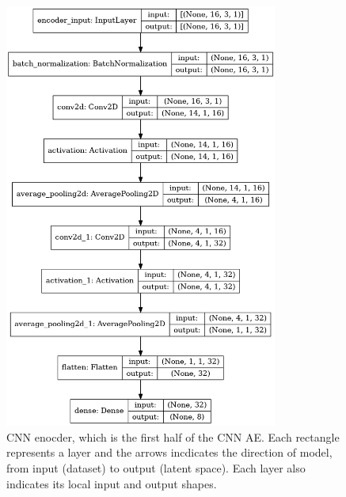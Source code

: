 \documentclass[a4paper]{article}
\theoremstyle{plain}
\theoremstyle{definition}
\begin{document}
            \begin{figure}[H]
                \centering
                    \begin{minipage}[c]{0.45\linewidth}
                        \centering
                        \includegraphics[width=0.8\textwidth]{encoder.png}
                        \caption{CNN enocder, which is the first half of the CNN AE. Each rectangle represents a layer and the arrows incdicates the direction of model, from input (dataset) to output (latent space). Each layer also indicates its local input and output shapes. }
                        \label{fig:cnn-encoder}
                    \end{minipage}
                \hfill
                    \begin{minipage}[c]{0.45\linewidth}
                        \centering

\end{minipage}
\end{figure}
\end{document}
